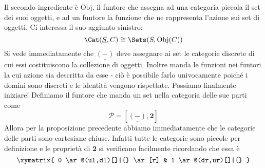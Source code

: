 Il secondo ingrediente è $\mathrm{Obj}$, il funtore che assegna ad una categoria piccola il set dei suoi oggetti, e ad un funtore la funzione che ne rappresenta l'azione sui set di oggetti. Ci interessa il suo aggiunto sinistro:
\[ \Cat(\underline{S},C) \cong \Sets(S,\mathrm{Obj}(C)) \]
Si vede immediatamente che $\underline{(-)}$ deve assegnare ai set le categorie discrete di cui essi costituiscono la collezione di oggetti. Inoltre manda le funzioni nei funtori la cui azione sia descritta da esse - ciò è possibile farlo univocamente poiché i domini sono discreti e le identità vengono rispettate.
Possiamo finalmente iniziare!
Definiamo il funtore che manda un set nella categoria delle sue parti come
\[\mathcal{P}=[\underline{(-)},\mathbf{2}]\]
Allora per la proposizione precedente abbiamo immediatamente che le categorie delle parti sono cartesiane chiuse. Infatti tutte le categorie sono piccole per definizione e le proprietà di $\mathbf{2}$ si verificano facilmente ricordando che essa è
\[\xymatrix{
0 \ar@(ul,dl)[]|{} \ar[r] & 1 \ar@(dr,ur)[]|{}
}\]

